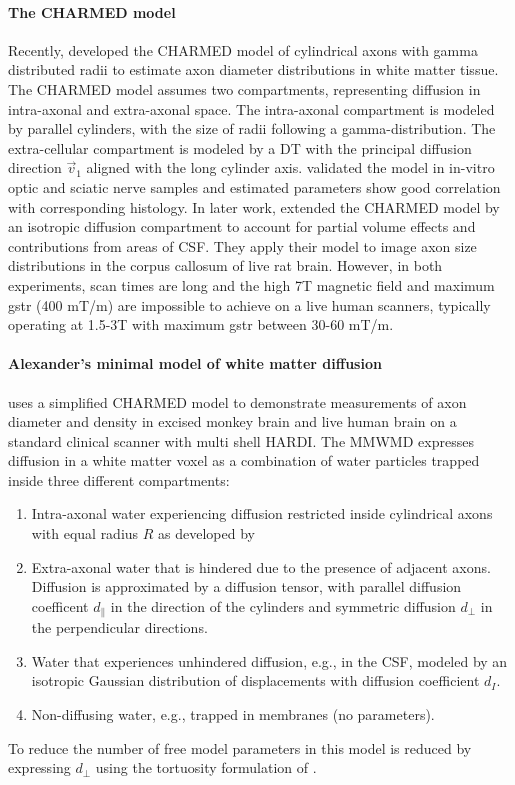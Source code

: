 \paragraph*{The CHARMED model} 
Recently, \citet{Assaf:2005} developed the CHARMED model of cylindrical axons with gamma distributed radii to estimate axon diameter distributions in white matter tissue. The CHARMED model assumes two compartments, representing diffusion in intra-axonal and extra-axonal space. The intra-axonal compartment is modeled by parallel cylinders, with the size of radii following a gamma-distribution. The extra-cellular compartment is modeled by a {\gls{DT}} with the principal diffusion direction $\vec{v}_1$ aligned with the long cylinder axis. \citet{Alexander:2008} validated the model in in-vitro optic and sciatic nerve samples and estimated parameters show good correlation with corresponding histology. In later work, \citet{Barazany:2009} extended the CHARMED model by an isotropic diffusion compartment to account for partial volume effects and contributions from areas of {\gls{CSF}}. They apply their model to image axon size distributions in the corpus callosum of live rat brain. However, in both experiments, scan times are long and the high 7T magnetic field and maximum {\gls{gstr}} (400 mT/m) are impossible to achieve on a live human scanners, typically operating at 1.5-3T with maximum {\gls{gstr}} between 30-60 mT/m.

\paragraph*{Alexander's minimal model of white matter diffusion} 
\label{par:alexanders_model}
\citet{Alexander:2010} uses a simplified CHARMED model to demonstrate measurements of axon diameter and density in excised monkey brain and live human brain on a standard clinical scanner with multi shell \gls{HARDI}. The \gls{MMWMD} expresses diffusion in a white matter voxel as a combination of water particles trapped inside three different compartments: 
\begin{enumerate}
  \item Intra-axonal water experiencing diffusion restricted inside cylindrical axons with equal radius $R$ as developed by \citet{VanGelderen:1994}
  \item Extra-axonal water that is hindered due to the presence of adjacent axons. Diffusion is approximated by a diffusion tensor, with parallel diffusion coefficent $d_\parallel$ in the direction of the cylinders and symmetric diffusion $d_\perp$ in the perpendicular directions.
  \item Water that experiences unhindered diffusion, e.g., in the {\gls{CSF}}, modeled by an isotropic Gaussian distribution of displacements with diffusion coefficient $d_{I}$.
  \item Non-diffusing water, e.g., trapped in membranes (no parameters).
\end{enumerate}
To reduce the number of free model parameters in this model is reduced by expressing $d_\perp$ using the tortuosity formulation of \citet{Szafer:1995}.


